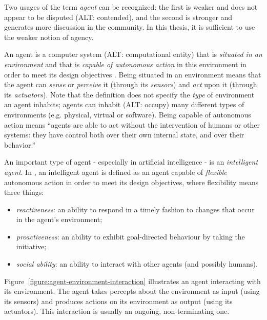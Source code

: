 Two usages of the term \textit{agent} can be recognized: the first is weaker and does not appear to be disputed (ALT: contended), and the second is stronger and generates more discussion in the community.
In this thesis, it is sufficient to use the weaker notion of agency.

An agent is a computer system (ALT: computational entity) that is \textit{situated in an environment} and that is \textit{capable of autonomous action} in this environment in order to meet its design objectives \cite{Wooldridge02}.
Being situated in an environment means that the agent can \textit{sense} or \textit{perceive} it (through its \textit{sensors}) and \textit{act} upon it (through its \textit{actuators}).
Note that the definition does not specify the \textit{type} of environment an agent inhabits; agents can inhabit (ALT: occupy) many different types of environments (e.g. physical, virtual or software).
Being capable of autonomous action means ``agents are able to act without the intervention of humans or other systems: they have control both over their own internal state, and over their behavior.'' \cite{Wooldridge02}

An important type of agent - especially in artificial intelligence - is an \textit{intelligent agent}.
In \cite{Wooldridge02}, an intelligent agent is defined as an agent capable of \textit{flexible} autonomous action in order to meet its design objectives, where flexibility means three things:
\begin{itemize}
	\item \textit{reactiveness}: an ability to respond in a timely fashion to changes that occur in the agent's environment;
	\item \textit{proactiveness}: an ability to exhibit goal-directed behaviour by taking the initiative;
	\item \textit{social ability}: an ability to interact with other agents (and possibly humans).
\end{itemize}

Figure~\ref{figure:agent-environment-interaction} illustrates an agent interacting with its environment.
The agent takes percepts about the environment as input (using its sensors) and produces actions on its environment as output (using its actuators).
This interaction is usually an ongoing, non-terminating one.

